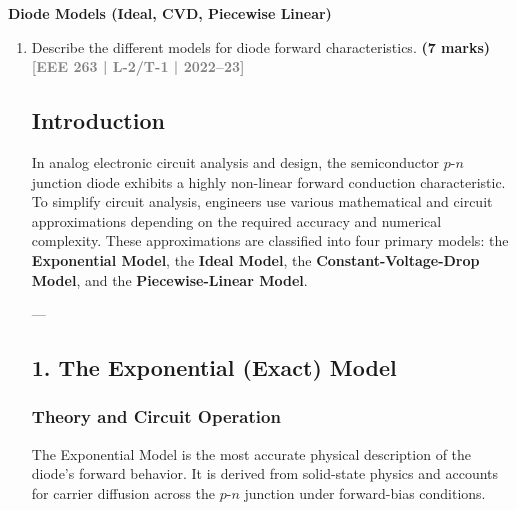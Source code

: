 \documentclass[12pt,a3paper]{article}
\newcommand{\yr}[1]{\hfill\textcolor{gray}{\small\textbf{[#1]}}}
\newcommand{\mk}[1]{\textcolor{orange!70!black}{\small\textbf{(#1 marks)}}}
\newcommand{\subtopic}[2]{%
  \vspace{10pt}
  \noindent\begin{tcolorbox}[colback=#1!8,colframe=#1,boxrule=0.6pt,arc=4pt,
    left=6pt,right=6pt,top=4pt,bottom=4pt]
    \small\bfseries\textcolor{#1}{#2}
  \end{tcolorbox}
  \vspace{2pt}
}
\begin{document}
\subtopic{cA}{Diode Models (Ideal, CVD, Piecewise Linear)}
\label{sub:s1-models}

\begin{enumerate}
    
\item Describe the different models for diode forward characteristics.
\mk{7} \yr{EEE 263 | L-2/T-1 | 2022--23}

\begin{tcolorbox}[enhanced,breakable,ansbox,colback=cA!4,colframe=cA,boxrule=0.8pt,arc=5pt,title={\textbf{Answer}},fonttitle=\bfseries\color{white},colbacktitle=cA]

\subsection*{Introduction}
In analog electronic circuit analysis and design, the semiconductor $p\text{-}n$ junction diode exhibits a highly non-linear forward conduction characteristic. To simplify circuit analysis, engineers use various mathematical and circuit approximations depending on the required accuracy and numerical complexity. These approximations are classified into four primary models: the \textbf{Exponential Model}, the \textbf{Ideal Model}, the \textbf{Constant-Voltage-Drop Model}, and the \textbf{Piecewise-Linear Model}.

---

\subsection*{1. The Exponential (Exact) Model}

\subsubsection*{Theory and Circuit Operation}
The Exponential Model is the most accurate physical description of the diode's forward behavior. It is derived from solid-state physics and accounts for carrier diffusion across the $p\text{-}n$ junction under forward-bias conditions.


\end{tcolorbox}
\end{enumerate}
\end{document}
